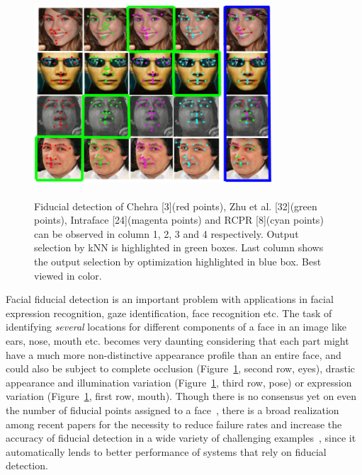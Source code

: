 \begin{figure}
    \centering
    \includegraphics[width=3.5in, height=3in]{fid/figures/first_page.png}
    \caption{ Fiducial detection of Chehra [3](red points), Zhu
              et al. [32](green points), Intraface [24](magenta points) and
              RCPR [8](cyan points) can be observed in column 1, 2, 3
              and 4 respectively. Output selection by kNN is highlighted
              in green boxes. Last column shows the output selection by
              optimization highlighted in blue box. Best viewed in color.}
    \label{fig:first_page}
\end{figure}

Facial fiducial detection is an important problem with applications in facial expression 
recognition, gaze identification, face recognition etc. The task of identifying \emph{several}
locations for different components of a face in an image like ears, nose, mouth etc. becomes
very daunting considering that each part might have a much more non-distinctive appearance
profile than an entire face, and could also be subject to complete occlusion
(Figure~\ref{fig:first_page}, second row, eyes), drastic appearance and illumination variation
(Figure~\ref{fig:first_page}, third row, pose) or expression variation
(Figure~\ref{fig:first_page}, first row, mouth).
Though there is no consensus
yet on even the number of fiducial points assigned to a face~\cite{smithECCV14_ED}, there is a
broad realization among recent papers for the necessity to reduce failure rates and increase
the accuracy of fiducial detection in a wide variety of challenging examples~\cite{smithECCV14_ED,
zhouICCV13_EGM, koetsingerBFIAT11_AFLW, kumarPAMI13_faceExem,artizzzuICCV13_COFW,yuECCV14_CoR},
since it automatically lends to better performance of systems that rely on fiducial detection.

